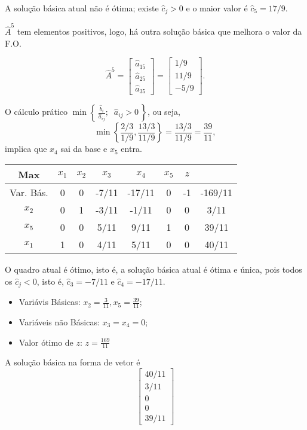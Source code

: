 A solução básica atual não é ótima; existe $ \widehat{c}_j > 0 $ e o maior valor
é $ \widehat{c}_5 = 17/9 $.

$ \widehat{A}^{5} $ tem elementos positivos, logo, há outra solução básica que
melhora o valor da F.O.

\[
  \widehat{A}^{5} =
  \begin{bmatrix}
    \widehat{a}_{15} \\
    \widehat{a}_{25} \\
    \widehat{a}_{35}
  \end{bmatrix} 
  =
  \begin{bmatrix}
     1/9  \\
     11/9 \\
    -5/9
  \end{bmatrix} .
\]

O cálculo prático $\min \left\{\,\frac{\widehat{b}_i}{\widehat{a}_{ij}};\;\; \widehat{a}_{ij} > 0\,\right\}$,
ou seja, 
\[
  \min \left\{\frac{2/3}{1/9}, \frac{13/3}{11/9}\right\}  
  =
  \frac{13/3}{11/9}
  = 
  \frac{39}{11},
\]
implica que $ x_4 $ sai da base e $ x_5 $ entra.

\newpage

\begin{table}[!htbp]
  \centering
  \begin{tabular}{c|cccccc|c}
    Max       & $x_1$ & $x_2$ & $x_3$ & $x_4$  & $x_5$ & $z$ &         \\ \hline
    Var. Bás. & 0     & 0     & -7/11 & -17/11 & 0     & -1  & -169/11 \\ \hline
    $x_2$     & 0     & 1     & -3/11 & -1/11  & 0     &  0  & 3/11    \\
    $x_5$     & 0     & 0     &  5/11 &  9/11  & 1     &  0  & 39/11   \\
    $x_1$     & 1     & 0     &  4/11 &  5/11  & 0     &  0  & 40/11
  \end{tabular}
\end{table}

O quadro atual é ótimo, isto é, a solução básica atual é ótima e única, pois 
todos os $ \widehat{c}_j < 0 $, isto é, $ \widehat{c}_3  = -7/11 $ e 
$ \widehat{c}_4 = -17/11 $.

\begin{itemize}
  \item Variávis Básicas: $ x_2 = \frac{3}{11}, x_5 = \frac{39}{11} $;
  \item Variáveis não Básicas: $ x_3 = x_4 = 0 $;
  \item Valor ótimo de $z$: $ z = \frac{169}{11}$
\end{itemize}

A solução básica na forma de vetor é 
\[
  \begin{bmatrix}
    40/11\\ 3/11 \\ 0 \\ 0 \\ 39/11
  \end{bmatrix}
\]